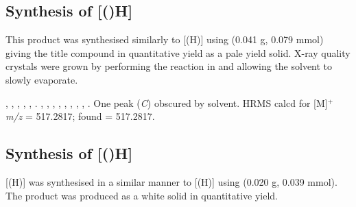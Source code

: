\subsection*{Synthesis of \texorpdfstring{[(\tButhixantphos)H]} t}


This product was synthesised similarly to [\tBuxantphos(H)] using \tButhixantphos{} (0.041 g, 0.079 mmol) giving the title compound in quantitative yield as a pale yield solid.  X-ray quality crystals were grown by performing the reaction in  and allowing the solvent to slowly evaporate.  

,
,
,
,
,
.
,
,
,
,
,
,
,
,
.
One peak (\emph{C}) obscured by solvent.
HRMS calcd for  [M]$^+$ \emph{m/z} = 517.2817; found = 517.2817.

\subsection*{Synthesis of \texorpdfstring{[(\tBusixantphos)H]} t}


[\tBuSixantphos(H)] was synthesised in a similar manner to [\tBuxantphos(H)] using \tBusixantphos{} (0.020 g, 0.039 mmol).  The product was produced as a white solid in quantitative yield.  

